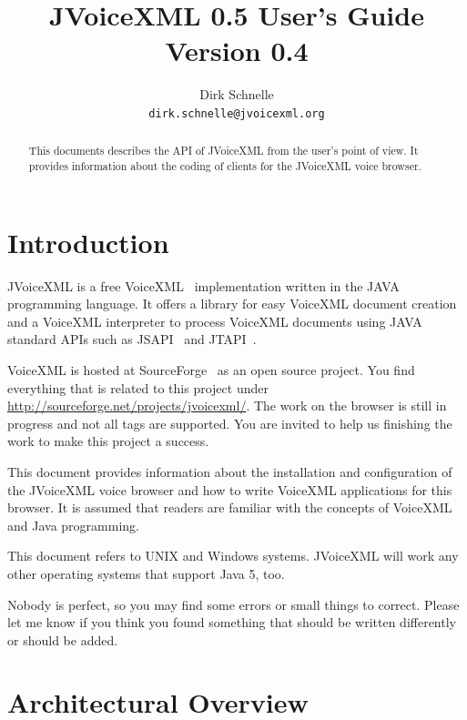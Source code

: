 \documentclass[11pt,a4paper]{article}
\title{JVoiceXML 0.5 User's Guide\\
Version 0.4}
\author{Dirk Schnelle \\
  \texttt{dirk.schnelle@jvoicexml.org} }
\date{}
\begin{document}
\pagestyle{headings}

\maketitle

\begin{abstract}
This documents describes the API of JVoiceXML from the user's point of
view. It provides information about the coding of clients for
the JVoiceXML voice browser.
\end{abstract}


\section{Introduction}
\label{sec:introduction}

JVoiceXML is a free VoiceXML~\cite{w3.org:voicexml} implementation written in 
the JAVA programming language. It offers a library for easy VoiceXML
document creation and a VoiceXML interpreter to process 
VoiceXML documents using JAVA standard APIs such as JSAPI~\cite{sun:jsapi} and
JTAPI~\cite{sun:jsapi}.

VoiceXML is hosted at SourceForge~\cite{sourceforge} as an open source project.
You find everything that is related to this project under
\url{http://sourceforge.net/projects/jvoicexml/}.
The work on the browser is still in progress and not all tags are
supported. You are invited to help us finishing the work to make this
project a success.

This document provides information about the installation and
configuration of the JVoiceXML voice browser and how to write
VoiceXML applications for this browser.
It is assumed that readers are familiar with the concepts of
VoiceXML and Java programming.

This document refers to UNIX and Windows systems. JVoiceXML will work 
any other operating systems that support Java 5, too.

Nobody is perfect, so you may find some errors or small things to correct.
Please let me know if you think you found something that should be written
differently or should be added.

\section{Architectural Overview}
\label{sec:arch-overv}
\end{document}
